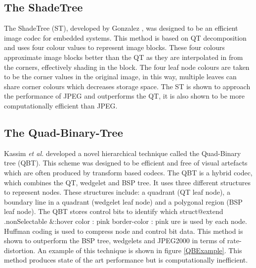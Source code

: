 
\subsection{The ShadeTree}

The ShadeTree (ST), developed by Gonzalez \cite{Gonzalez07ShadeTree}, was designed to be an efficient image codec for embedded systems. This method is based on QT decomposition and uses four colour values to represent image blocks. These four colours approximate image blocks better than the QT as they are interpolated in from the corners, effectively shading in the block. The four leaf node colours are taken to be the corner values in the original image, in this way, multiple leaves can share corner colours which decreases storage space. The ST is shown to approach the performance of JPEG and outperforms the QT, it is also shown to be more computationally efficient than JPEG.

\subsection{The Quad-Binary-Tree}

Kassim \textit{et al.} \cite{Kassim09Hierarchical} developed a novel hierarchical technique called the Quad-Binary tree (QBT). This scheme was designed to be efficient and free of visual artefacts which are often produced by transform based codecs. The QBT is a hybrid codec, which combines the QT, wedgelet and BSP tree. It uses three different structures to represent nodes. These structures include: a quadrant (QT leaf node), a boundary line in a quadrant (wedgelet leaf node) and a polygonal region (BSP leaf node). The QBT stores control bits to identify which struct@extend .nonSelectable
    &:hover
        color : pink
        border-color : pink
    ure is used by each node. Huffman coding is used to compress node and control bit data. This method is shown to outperform the BSP tree, wedgelets and JPEG2000 in terms of rate-distortion. An example of this technique is shown in figure \ref{QBExample}. This method produces state of the art performance but is computationally inefficient.

